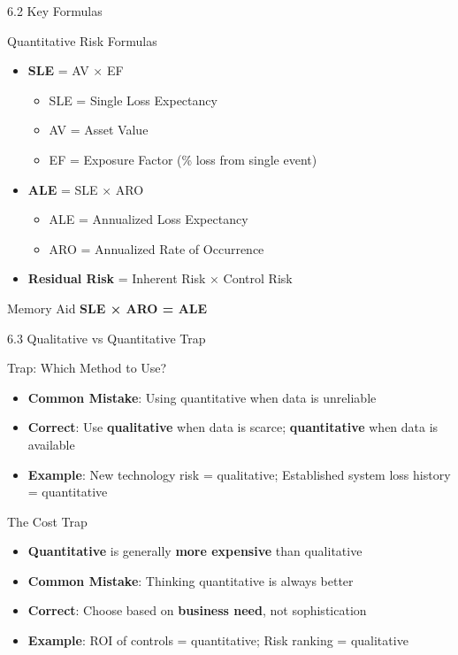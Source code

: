\documentclass{beamer}
\begin{document}
	\begin{frame}{6.2 Key Formulas}
		\begin{block}{Quantitative Risk Formulas}
			\begin{itemize}
				\item \textbf{SLE} = AV × EF
				\begin{itemize}
					\item SLE = Single Loss Expectancy
					\item AV = Asset Value
					\item EF = Exposure Factor (\% loss from single event)
				\end{itemize}
				\item \textbf{ALE} = SLE × ARO
				\begin{itemize}
					\item ALE = Annualized Loss Expectancy
					\item ARO = Annualized Rate of Occurrence
				\end{itemize}
				\item \textbf{Residual Risk} = Inherent Risk × Control Risk
			\end{itemize}
		\end{block}
		
		\begin{alertblock}{Memory Aid}
			\textbf{SLE × ARO = ALE}
		\end{alertblock}
	\end{frame}
	
	\begin{frame}{6.3 Qualitative vs Quantitative Trap}
		\begin{block}{Trap: Which Method to Use?}
			\begin{itemize}
				\item \textbf{Common Mistake}: Using quantitative when data is unreliable
				\item \textbf{Correct}: Use \textbf{qualitative} when data is scarce; \textbf{quantitative} when data is available
				\item \textbf{Example}: New technology risk = qualitative; Established system loss history = quantitative
			\end{itemize}
		\end{block}
		
		\begin{block}{The Cost Trap}
			\begin{itemize}
				\item \textbf{Quantitative} is generally \textbf{more expensive} than qualitative
				\item \textbf{Common Mistake}: Thinking quantitative is always better
				\item \textbf{Correct}: Choose based on \textbf{business need}, not sophistication
				\item \textbf{Example}: ROI of controls = quantitative; Risk ranking = qualitative
			\end{itemize}
		\end{block}
	\end{frame}
	
\end{document}
